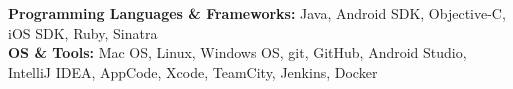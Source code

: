 

\begin{cvparagraph}

\textbf{Programming Languages \& Frameworks:} Java, Android SDK, Objective-C, iOS SDK, Ruby, Sinatra
\\[2pt]
\textbf{OS \& Tools:} Mac OS, Linux, Windows OS, git, GitHub, Android Studio, IntelliJ IDEA, AppCode, Xcode, TeamCity, Jenkins, Docker

\end{cvparagraph}